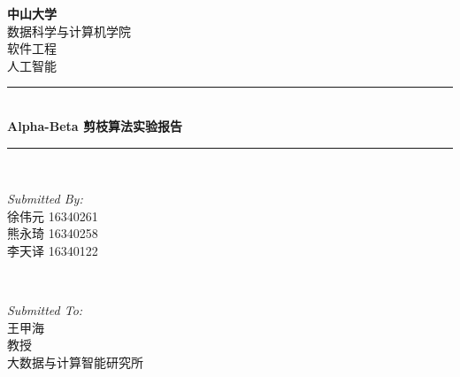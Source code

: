 \begin{titlepage}

\newcommand{\HRule}{\rule{\linewidth}{0.5mm}} %

\center %
 

\textsc{\LARGE \bfseries 中山大学 }\\[0.3cm] %
\textsc{\Large 数据科学与计算机学院}\\[0.5cm] %
\textsc{\Large 软件工程}\\[0.3cm] %
\textsc{\Large 人工智能}\\[0.5cm]


\HRule \\[0.4cm]
{ \huge \bfseries Alpha-Beta 剪枝算法实验报告}\\[0.03cm] %
\HRule \\[1.5cm]

 

\begin{minipage}{0.4\textwidth}
\begin{flushleft} \large
\emph{Submitted By:}\\
徐伟元 16340261\\
熊永琦 16340258\\
李天译 16340122
\end{flushleft}
\end{minipage}
~
\begin{minipage}{0.5\textwidth}
\begin{flushright} \large
\emph{Submitted To:} \\
王甲海\\ 教授\\ 大数据与计算智能研究所 %
\end{flushright}
\end{minipage}\\[1cm]


\end{titlepage}
